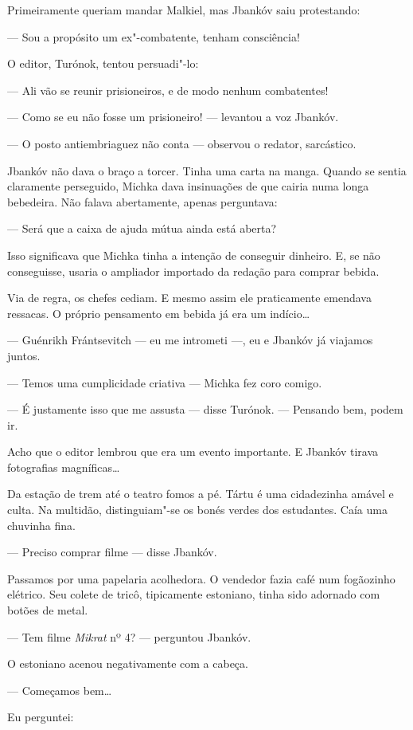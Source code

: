 Primeiramente queriam mandar Malkiel, mas Jbankóv saiu protestando:

--- Sou a propósito um ex"-combatente, tenham consciência!

O editor, Turónok, tentou persuadi"-lo:

--- Ali vão se reunir prisioneiros, e de modo nenhum combatentes!

--- Como se eu não fosse um prisioneiro! --- levantou a voz Jbankóv.

--- O posto antiembriaguez não conta --- observou o redator, sarcástico.

Jbankóv não dava o braço a torcer. Tinha uma carta na manga. Quando se
sentia claramente perseguido, Michka dava insinuações de que cairia numa
longa bebedeira. Não falava abertamente, apenas perguntava:

--- Será que a caixa de ajuda mútua ainda está aberta?

Isso significava que Michka tinha a intenção de conseguir dinheiro. E,
se não conseguisse, usaria o ampliador importado da redação para comprar
bebida.

Via de regra, os chefes cediam. E mesmo assim ele praticamente emendava
ressacas. O próprio pensamento em bebida já era um indício\ldots{}

--- Guénrikh Frántsevitch --- eu me intrometi ---, eu e Jbankóv já
viajamos juntos.

--- Temos uma cumplicidade criativa --- Michka fez coro comigo.

--- É justamente isso que me assusta --- disse Turónok. --- Pensando
bem, podem ir.

Acho que o editor lembrou que era um evento importante. E Jbankóv tirava
fotografias magníficas\ldots{}

Da estação de trem até o teatro fomos a pé. Tártu é uma cidadezinha
amável e culta. Na multidão, distinguiam"-se os bonés verdes dos
estudantes. Caía uma chuvinha fina.

--- Preciso comprar filme --- disse Jbankóv.

Passamos por uma papelaria acolhedora. O vendedor fazia café num
fogãozinho elétrico. Seu colete de tricô, tipicamente estoniano, tinha
sido adornado com botões de metal.

--- Tem filme \emph{Mikrat} nº 4? --- perguntou Jbankóv.

O estoniano acenou negativamente com a cabeça.

--- Começamos bem\ldots{}

Eu perguntei:

